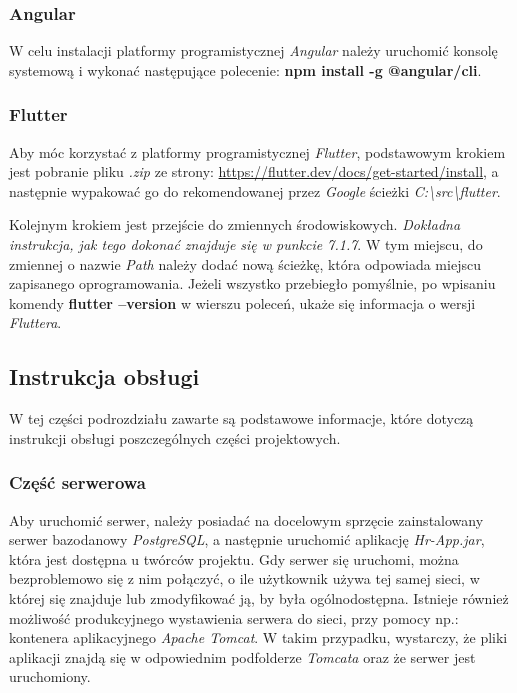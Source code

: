 \documentclass[twoside]{projektInzynierskiMS}
\numberwithin{figure}{section}
\begin{document}
\subsubsection{Angular}
W celu instalacji platformy programistycznej \textit{Angular} należy uruchomić konsolę systemową i wykonać następujące polecenie: \textbf{npm install -g @angular/cli}.

\subsubsection{Flutter}
Aby móc korzystać z platformy programistycznej \textit{Flutter}, podstawowym krokiem jest pobranie pliku \textit{.zip} ze strony: \url{https://flutter.dev/docs/get-started/install}, a następnie wypakować go do rekomendowanej przez \textit{Google} ścieżki \linebreak\textit{C:\textbackslash src\textbackslash flutter}.

Kolejnym krokiem jest przejście do zmiennych środowiskowych. \textit{Dokładna instrukcja, jak tego dokonać znajduje się w punkcie 7.1.7}. W tym miejscu, do zmiennej o nazwie \textit{Path} należy dodać nową ścieżkę, która odpowiada miejscu zapisanego oprogramowania. Jeżeli wszystko przebiegło pomyślnie, po wpisaniu komendy \textbf{flutter --version} w wierszu poleceń, ukaże się informacja o wersji \textit{Fluttera}. 

\subsection{Instrukcja obsługi}
W tej części podrozdziału zawarte są podstawowe informacje, które dotyczą instrukcji obsługi poszczególnych części projektowych.

\subsubsection{Część serwerowa}
Aby uruchomić serwer, należy posiadać na docelowym sprzęcie zainstalowany serwer bazodanowy \textit{PostgreSQL}, a następnie uruchomić aplikację \textit{Hr-App.jar}, która jest dostępna u twórców projektu. Gdy serwer się uruchomi, można bezproblemowo się z nim połączyć, o ile użytkownik używa tej samej sieci, w której się znajduje lub zmodyfikować ją, by była ogólnodostępna. Istnieje również możliwość produkcyjnego wystawienia serwera do sieci, przy pomocy np.: kontenera aplikacyjnego \textit{Apache Tomcat}. W takim przypadku, wystarczy, że pliki aplikacji znajdą się w odpowiednim podfolderze \textit{Tomcata} oraz że serwer jest uruchomiony.
\end{document}
